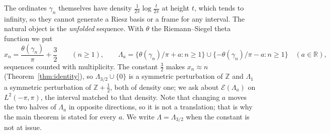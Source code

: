 \documentclass[11pt]{article}
\newcommand{\R}{\mathbb{R}}
\newcommand{\Z}{\mathbb{Z}}
\newcommand{\Lam}{\Lambda}
\newcommand{\E}{\mathcal{E}}
\begin{document}
The ordinates $\gamma_n$ themselves have density $\frac{1}{2\pi}\log\frac{t}{2\pi}$ at height $t$, which tends to infinity, so they cannot generate a Riesz basis or a frame for any interval. The natural object is the \emph{unfolded} sequence. With $\theta$ the Riemann--Siegel theta function we put
\begin{equation}\label{eq:unfold}
x_n=\frac{\theta(\gamma_n)}{\pi}+\frac32\qquad(n\ge1),\qquad \Lam_a=\{\theta(\gamma_n)/\pi+a:n\ge1\}\cup\{-\theta(\gamma_n)/\pi-a:n\ge1\}\quad(a\in\R),
\end{equation}
sequences counted with multiplicity. The constant $\frac32$ makes $x_n\approx n$ (Theorem~\ref{thm:identity}), so $\Lam_{3/2}\cup\{0\}$ is a symmetric perturbation of $\Z$ and $\Lam_1$ a symmetric perturbation of $\Z+\frac12$, both of density one; we ask about $\E(\Lam_a)$ on $L^2(-\pi,\pi)$, the interval matched to that density. Note that changing $a$ moves the two halves of $\Lam_a$ in opposite directions, so it is not a translation; that is why the main theorem is stated for every $a$. We write $\Lam=\Lam_{3/2}$ when the constant is not at issue.
\end{document}
